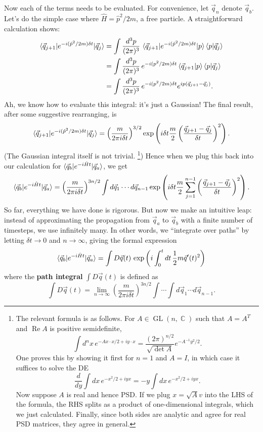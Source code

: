 \documentclass{report}
\theoremstyle{plain}
\theoremstyle{definition}
\theoremstyle{remark}
\DeclareMathOperator{\bC}{\mathbb{C}}
\DeclareMathOperator{\re}{Re}
\DeclareMathOperator{\GL}{GL}
\begin{document}
Now each of the terms needs to be evaluated. For convenience, let
$\vec{q}_n$ denote $\vec{q}_b$. Let's do the simple case where
$\hat{H} = \hat{p}^2/2m$, a free particle. A straightforward
calculation shows:
\begin{align*}
  \braket{\vec{q}_{j+1}|e^{-i(\hat{p}^2/2m)\delta t}|\vec{q}_j}
  &= \int \frac{d^3p}{(2\pi)^3} \, \braket{\vec{q}_{j+1}|e^{-i(\hat{p}^2/2m)\delta t}|p}\braket{p|\vec{q}_j} \\
  &= \int \frac{d^3p}{(2\pi)^3} \, e^{-i(p^2/2m)\delta t} \braket{\vec{q}_{j+1}|p}\braket{p|\vec{q}_j} \\
  &= \int \frac{d^3p}{(2\pi)^3} \, e^{-i(p^2/2m)\delta t} e^{ip(\vec{q}_{j+1} - \vec{q}_j)}.
\end{align*}
Ah, we know how to evaluate this integral: it's just a Gaussian! The
final result, after some suggestive rearranging, is
$$ \braket{\vec{q}_{j+1}|e^{-i(\hat{p}^2/2m)\delta t}|\vec{q}_j} = \left(\frac{m}{2\pi i\delta t}\right)^{3/2} \exp\left(i\delta t \frac{m}{2}\left(\frac{\vec{q}_{j+1} - \vec{q}_j}{\delta t}\right)^2\right). $$
(The Gaussian integral itself is not trivial. \footnote{The relevant
formula is as follows. For $A \in \GL(n, \bC)$ such that $A = A^T$
and $\re A$ is positive semidefinite,
$$ \int d^nx \, e^{-Ax \cdot x/2 + iy \cdot x} = \frac{(2\pi)^{n/2}}{\sqrt{\det A}} e^{-A^{-1} y^2/2}. $$ 
One proves this by showing it first for $n = 1$ and $A = I$, in which
case it suffices to solve the DE
$$ \frac{d}{dy} \int dx \, e^{-x^2/2 + iyx} = -y \int dx \, e^{-x^2/2 + iyx}. $$
Now suppose $A$ is real and hence PSD. If we plug $x = \sqrt{A}v$ into
the LHS of the formula, the RHS splits as a product of one-dimensional
integrals, which we just calculated. Finally, since both sides are
analytic and agree for real PSD matrices, they agree in general.})
Hence when we plug this back into our calculation for
$\braket{\vec{q}_b|e^{-i\hat{H}t}|\vec{q}_a}$, we get
$$ \braket{\vec{q}_b|e^{-i\hat{H}t}|\vec{q}_a} = \left(\frac{m}{2\pi i\delta t}\right)^{3n/2} \int d\vec{q}_1 \cdots d\vec{q}_{n-1} \exp\left(i\delta t \frac{m}{2}\sum_{j=1}^{n-1} \left(\frac{\vec{q}_{j+1} - \vec{q}_j}{\delta t}\right)^2\right). $$
So far, everything we have done is rigorous. But now we make an
intuitive leap: instead of approximating the propagation from
$\vec{q}_a$ to $\vec{q}_b$ with a finite number of timesteps, we use
infinitely many. In other words, we ``integrate over paths'' by
letting $\delta t \to 0$ and $n \to \infty$, giving the formal
expression
$$ \braket{\vec{q}_b|e^{-i\hat{H}t}|\vec{q}_a} = \int D\vec{q}(t) \, \exp\left(i \int_0^t dt \, \frac{1}{2} m \vec{q}'(t)^2\right) $$
where the {\bf path integral} $\int D\vec{q}(t)$ is defined as
$$ \int D\vec{q}(t) = \lim_{n \to \infty} \left(\frac{m}{2\pi i\delta t}\right)^{3n/2} \int \cdots \int d\vec{q}_1 \cdots d\vec{q}_{n-1}. $$
\end{document}
